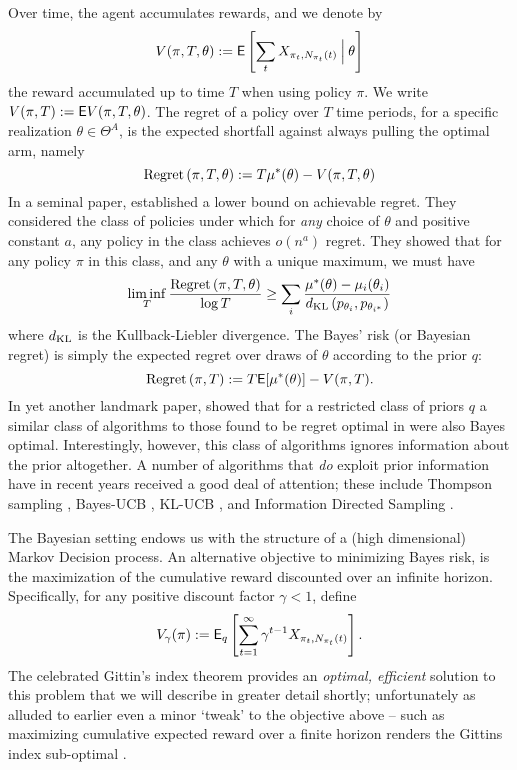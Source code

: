 Over time, the agent accumulates rewards, and we denote by 
\[
V(\pi, T, \theta) := 
\E\left[
	\sum_t
	X_{
		\pi_t,
		N_{\pi_t}(t)
	}
	\given[\Big]
	\theta
\right]
\] 
the reward accumulated up to time $T$ when using policy $\pi$. We write $V(\pi,T) := \E{V(\pi,T,\theta)}$. The regret of a policy over $T$ time periods, for a specific realization $\theta \in \Theta^A$, is the expected shortfall against always pulling the optimal arm, namely
\[
\Regret{\pi, T, \theta} := 
T \mu^*(\theta) -
V(\pi, T, \theta)
\]
In a seminal paper, \cite{lai1985asymptotically} established a lower bound on achievable regret. They considered the class of policies under which for {\em any} choice of $\theta$ and positive constant $a$, any policy in the class achieves $o(n^a)$ regret. They showed that for any policy $\pi$ in this class, and any $\theta$ with a unique maximum, we must have
\begin{equation}
\label{eq:lai_robbins_lb}
\liminf_T
\frac{
	\Regret{\pi, T, \theta}
}
{
	\log T
}
\geq
\sum_{i}
\frac{\mu^*(\theta) - \mu_i(\theta_i)}{d_{\rm KL}\left(p_{\theta_i},p_{\theta_{i^*}} \right)}
\end{equation}
where $d_{\rm KL}$ is the Kullback-Liebler divergence. The Bayes' risk (or Bayesian regret) is simply the expected regret over draws of $\theta$ according to the prior $q$:
\[
\Regret{\pi, T} := T \E[\mu^*(\theta)] - V(\pi, T).
\]
In yet another landmark paper, \cite{lai1985asymptotically} showed that for a restricted class of priors $q$ a similar class of algorithms to those found to be regret optimal in \cite{lai1985asymptotically} were also Bayes optimal. Interestingly, however, this class of algorithms ignores information about the prior altogether. A number of algorithms that {\em do} exploit prior information have in recent years received a good deal of attention; these include Thompson sampling \cite{thompson1933likelihood}, Bayes-UCB \cite{kaufmann2012thompson}, KL-UCB \cite{garivier2011kl}, and Information Directed Sampling \cite{russo2014learning}. 

The Bayesian setting endows us with the structure of a (high dimensional) Markov Decision process. An alternative objective to minimizing Bayes risk, is the maximization of the cumulative reward discounted over an infinite horizon. Specifically, for any positive discount factor $\gamma < 1$, define
\[
V_\gamma(\pi) := 
\E_q \left[
	\sum_{t=1}^\infty \gamma^{t-1} X_{\pi_t,N_{\pi_t}(t)}
\right].
\]
The celebrated Gittin's index theorem provides an {\em optimal, efficient} solution to this problem that we will describe in greater detail shortly; unfortunately as alluded to earlier even a minor `tweak' to the objective above -- such as maximizing cumulative expected reward over a finite horizon renders the Gittins index sub-optimal \cite{nino2011computing}. 

